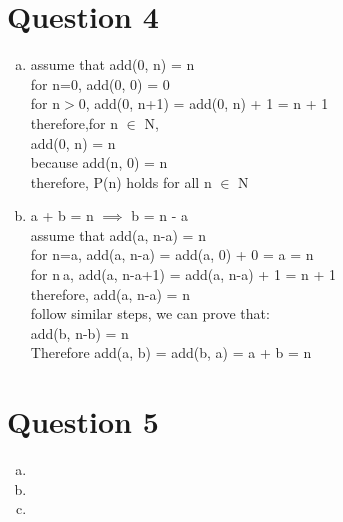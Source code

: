 \documentclass[11pt, a4paper]{article}
\begin{document}
\section*{Question 4}
\begin{enumerate}[(a)]
    \item
    assume that add(0, n) = n\\
    for n=0, add(0, 0) = 0\\
    for n$>$0, add(0, n+1) = add(0, n) + 1 = n + 1\\
    therefore,for n $\in$ N,\\
    add(0, n) = n\\
    because add(n, 0) = n\\
    therefore, P(n) holds for all n $\in$ N
    \item
    a + b = n $\implies$ b = n - a\\
    assume that add(a, n-a) = n\\
    for n=a, add(a, n-a) = add(a, 0) + 0 = a = n\\
    for n$\>$a, add(a, n-a+1) = add(a, n-a) + 1 = n + 1\\
    therefore, add(a, n-a) = n\\
    follow similar steps, we can prove that:\\
    add(b, n-b) = n\\
    Therefore add(a, b) = add(b, a) = a + b = n
\end{enumerate}

\section*{Question 5}
\begin{enumerate}[(a)]
    \item


    \item


    \item
\end{enumerate}
\end{document}

